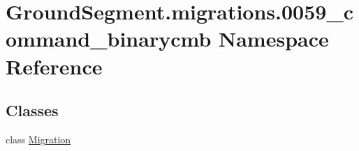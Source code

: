 \hypertarget{namespace_ground_segment_1_1migrations_1_10059__command__binarycmb}{}\section{Ground\+Segment.\+migrations.0059\+\_\+command\+\_\+binarycmb Namespace Reference}
\label{namespace_ground_segment_1_1migrations_1_10059__command__binarycmb}
\subsection*{Classes}
\begin{DoxyCompactItemize}
\item 
class \hyperlink{class_ground_segment_1_1migrations_1_10059__command__binarycmb_1_1_migration}{Migration}
\end{DoxyCompactItemize}
